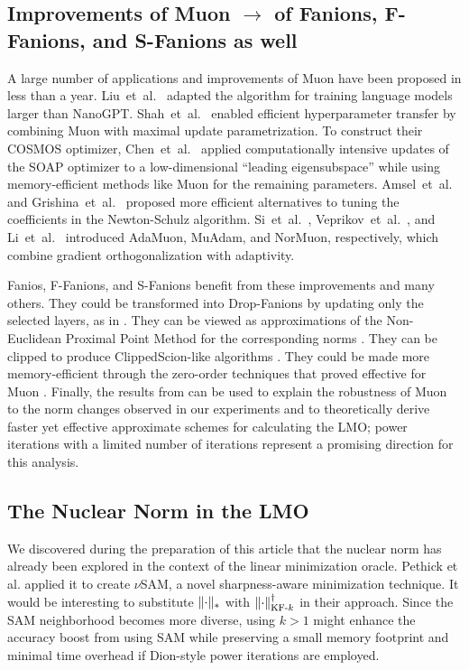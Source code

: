 \documentclass[smallextended,referee,envcountsect]{svjour3}
\DeclarePairedDelimiter{\normn}{\|}{\|_{*}}
\DeclarePairedDelimiter{\normkfk}{\|}{\|_{\text{KF-}k}}
\begin{document}
 \subsection{Improvements of Muon $\rightarrow$ of Fanions, F-Fanions, and S-Fanions as well}
 A large number of applications and improvements of Muon have been proposed in less than a year. Liu~et~al.~\cite{liu2025muonscalablellmtraining} adapted the algorithm for training language models larger than NanoGPT. Shah~et~al.~\cite{shah2025practical} enabled efficient hyperparameter transfer by combining Muon with maximal update parametrization. To construct their COSMOS optimizer, Chen~et~al.~\cite{chen2025cosmoshybridadaptive} applied computationally intensive updates of the SOAP optimizer \citep{vyas2025soap} to a low-dimensional ``leading eigensubspace'' while using memory-efficient methods like Muon for the remaining parameters. Amsel~et~al.~\cite{amsel2025polar} and Grishina~et~al.~\cite{grishina2025chebyshev} proposed more efficient alternatives to tuning the coefficients in the Newton-Schulz algorithm. Si~et~al.~\cite{si2025adamuon}, Veprikov~et~al.~\cite{veprikov2025preconditioned}, and Li~et~al.~\cite{li2025normuon} introduced AdaMuon, MuAdam, and NorMuon, respectively, which combine gradient orthogonalization with adaptivity.

 Fanios, F-Fanions, and S-Fanions benefit from these improvements and many others. They could be transformed into Drop-Fanions by updating only the selected layers, as in \citep{gruntkowska2025dropmuon}. They can be viewed as approximations of the Non-Euclidean Proximal Point Method for the corresponding norms \citep{gruntkowska2025noneuclideanbroximal}. They can be clipped to produce ClippedScion-like algorithms \citep{pethick2025generalizedgradientnormclipping}. They could be made more memory-efficient through the zero-order techniques that proved effective for Muon \citep{petrov2025zeromuon}. Finally, the results from \citep{shulgin2025inexactmuon} can be used to explain the robustness of Muon to the norm changes observed in our experiments and to theoretically derive faster yet effective approximate schemes for calculating the LMO; power iterations with a limited number of iterations represent a promising direction for this analysis.
 
 \subsection{The Nuclear Norm in the LMO}
 
 We discovered during the preparation of this article that the nuclear norm has already been explored in the context of the linear minimization oracle. Pethick et al. \citep{pethick2025sam} applied it to create $\nu$SAM, a novel sharpness-aware minimization technique. It would be interesting to substitute $\normn{\cdot}$ with $\normkfk{\cdot}^\dagger$ in their approach. Since the SAM neighborhood becomes more diverse, using $k > 1$ might enhance the accuracy boost from using SAM while preserving a small memory footprint and minimal time overhead if Dion-style power iterations are employed.
 
\end{document}
